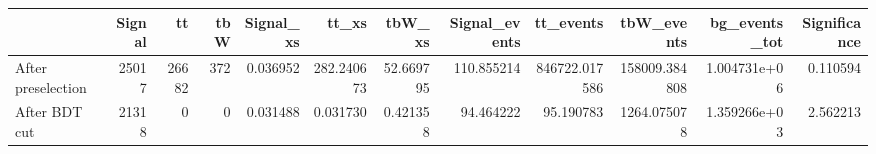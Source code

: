 \begin{tabular}{lrrrrrrrrrrr}
\toprule
{} &  Signal &     tt &  tbW &  Signal_xs &       tt_xs &     tbW_xs &  Signal_events &      tt_events &     tbW_events &  bg_events_tot &  Significance \\
\midrule
After preselection &   25017 &  26682 &  372 &   0.036952 &  282.240673 &  52.669795 &     110.855214 &  846722.017586 &  158009.384808 &   1.004731e+06 &      0.110594 \\
After BDT cut      &   21318 &      0 &    0 &   0.031488 &    0.031730 &   0.421358 &      94.464222 &      95.190783 &    1264.075078 &   1.359266e+03 &      2.562213 \\
\bottomrule
\end{tabular}
